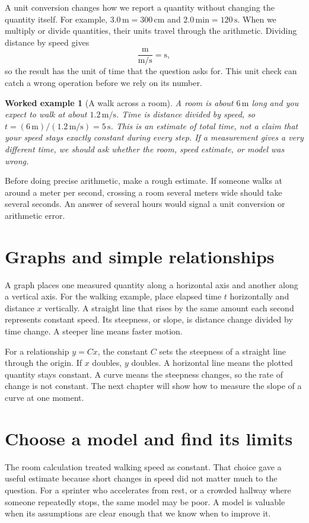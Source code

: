 \documentclass[11pt,oneside]{book}
\theoremstyle{reviewstyle}
\newtheorem{example}{Worked example}[chapter]
\begin{document}
A unit conversion changes how we report a quantity without changing the quantity itself. For example, $3.0\,\mathrm m=300\,\mathrm{cm}$ and $2.0\,\mathrm{min}=120\,\mathrm s$. When we multiply or divide quantities, their units travel through the arithmetic. Dividing distance by speed gives
\begin{equation}
\frac{\mathrm m}{\mathrm{m/s}}=\mathrm s,
\end{equation}
so the result has the unit of time that the question asks for. This unit check can catch a wrong operation before we rely on its number.

\begin{example}[A walk across a room]
A room is about $6\,\mathrm m$ long and you expect to walk at about $1.2\,\mathrm{m/s}$. Time is distance divided by speed, so $t=(6\,\mathrm m)/(1.2\,\mathrm{m/s})=5\,\mathrm s$. This is an estimate of total time, not a claim that your speed stays exactly constant during every step. If a measurement gives a very different time, we should ask whether the room, speed estimate, or model was wrong.
\end{example}

Before doing precise arithmetic, make a rough estimate. If someone walks at around a meter per second, crossing a room several meters wide should take several seconds. An answer of several hours would signal a unit conversion or arithmetic error.

\section{Graphs and simple relationships}
A graph places one measured quantity along a horizontal axis and another along a vertical axis. For the walking example, place elapsed time $t$ horizontally and distance $x$ vertically. A straight line that rises by the same amount each second represents constant speed. Its steepness, or slope, is distance change divided by time change. A steeper line means faster motion.

For a relationship $y=Cx$, the constant $C$ sets the steepness of a straight line through the origin. If $x$ doubles, $y$ doubles. A horizontal line means the plotted quantity stays constant. A curve means the steepness changes, so the rate of change is not constant. The next chapter will show how to measure the slope of a curve at one moment.

\section{Choose a model and find its limits}
The room calculation treated walking speed as constant. That choice gave a useful estimate because short changes in speed did not matter much to the question. For a sprinter who accelerates from rest, or a crowded hallway where someone repeatedly stops, the same model may be poor. A model is valuable when its assumptions are clear enough that we know when to improve it.
\end{document}
